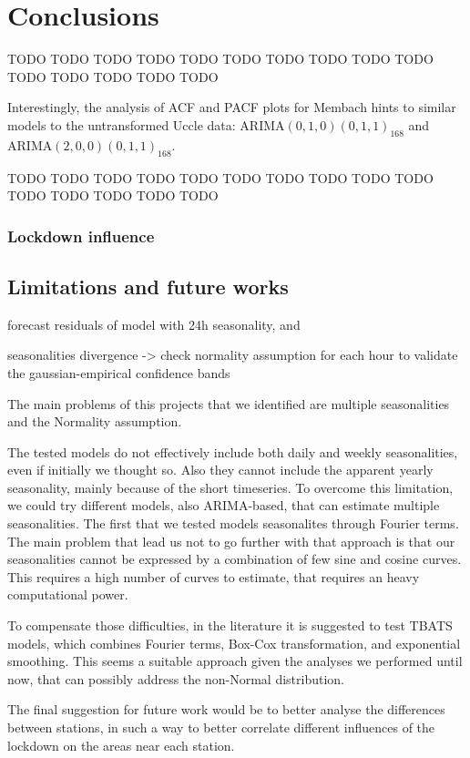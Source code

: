 \documentclass[12pt]{article}
\begin{document}
\section{Conclusions}
TODO TODO TODO TODO TODO TODO TODO TODO TODO TODO TODO TODO TODO TODO TODO 

Interestingly, the analysis of ACF and PACF plots for Membach hints to similar models to the untransformed Uccle data:
$\mathrm{ARIMA}(0,1,0)(0,1,1)_{168}$ and $\mathrm{ARIMA}(2,0,0)(0,1,1)_{168}$.

TODO TODO TODO TODO TODO TODO TODO TODO TODO TODO TODO TODO TODO TODO TODO 

\subsubsection{Lockdown influence}
\subsection{Limitations and future works}
forecast residuals of model with 24h seasonality, and 

seasonalities divergence -> check normality assumption for each hour to validate the gaussian-empirical confidence bands

The main problems of this projects that we identified are multiple seasonalities and the Normality assumption.

The tested models do not effectively include both daily and weekly seasonalities, even if initially we thought so. Also they cannot include the apparent yearly seasonality, mainly because of the short timeseries.
To overcome this limitation, we could try different models, also ARIMA-based, that can estimate multiple seasonalities. The first that we tested models seasonalites through Fourier terms. The main problem that lead us not to go further with that approach is that our seasonalities cannot be expressed by a combination of few sine and cosine curves. This requires a high number of curves to estimate, that requires an heavy computational power.

To compensate those difficulties, in the literature it is suggested to test TBATS models, which combines Fourier terms, Box-Cox transformation, and exponential smoothing. This seems a suitable approach given the analyses we performed until now, that can possibly address the non-Normal distribution.

The final suggestion for future work would be to better analyse the differences between stations, in such a way to better correlate different influences of the lockdown on the areas near each station.




\newpage

\end{document}
